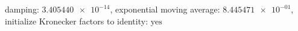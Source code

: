 damping: $\num[scientific-notation=true]{3.405440e-14}$, exponential moving average: $\num[scientific-notation=true]{8.445471e-01}$, initialize Kronecker factors to identity: $\text{yes}$